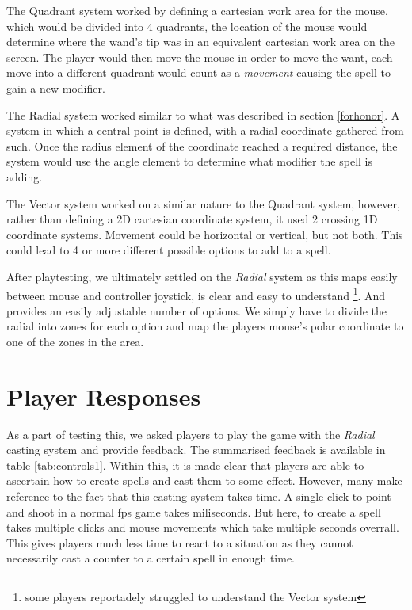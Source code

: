 \documentclass[12pt,a4paper]{report}
\begin{document}
The Quadrant system worked by defining a cartesian work area for the mouse, which would be divided into 4 quadrants, the location of the mouse would determine where the wand's tip was in an equivalent cartesian work area on the screen. The player would then move the mouse in order to move the want, each move into a different quadrant would count as a \textit{movement} causing the spell to gain a new modifier.

The Radial system worked similar to what was described in section \ref{forhonor}. A system in which a central point is defined, with a radial coordinate gathered from such. Once the radius element of the coordinate reached a required distance, the system would use the angle element to determine what modifier the spell is adding.

The Vector system worked on a similar nature to the Quadrant system, however, rather than defining a 2D cartesian coordinate system, it used 2 crossing 1D coordinate systems. Movement could be horizontal or vertical, but not both. This could lead to 4 or more different possible options to add to a spell.

After playtesting, we ultimately settled on the \textit{Radial} system as this maps easily between mouse and controller joystick, is clear and easy to understand \footnote{some players reportadely struggled to understand the Vector system}. And provides an easily adjustable number of options. We simply have to divide the radial into zones for each option and map the players mouse's polar coordinate to one of the zones in the area.

\section{Player Responses}

As a part of testing this, we asked players to play the game with the \textit{Radial} casting system and provide feedback. The summarised feedback is available in table \ref{tab:controls1}. Within this, it is made clear that players are able to ascertain how to create spells and cast them to some effect. However, many make reference to the fact that this casting system takes time. A single click to point and shoot in a normal \gls{fps} game takes miliseconds. But here, to create a spell takes multiple clicks and mouse movements which take multiple seconds overrall. This gives players much less time to react to a situation as they cannot necessarily cast a counter to a certain spell in enough time.
\end{document}
